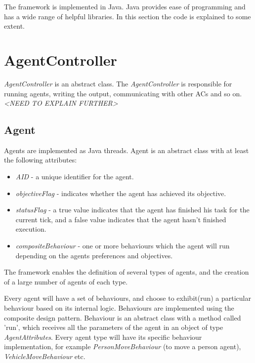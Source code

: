 The framework is implemented in Java. Java provides ease of
programming and has a wide range of helpful libraries. In this section
the code is explained to some extent.

\section{ AgentController }
\textit{AgentController} is an abstract class. The
\textit{AgentController} is responsible for running agents, writing
the output, communicating with other ACs and so on.  \textit{<NEED TO
  EXPLAIN FURTHER>}

\subsection{ Agent }
Agents are implemented as Java threads. Agent is an abstract class
with at least the following attributes:

\begin{itemize}
\item \textit{AID} - a unique identifier for the agent.
\item \textit{objectiveFlag} - indicates whether the agent has
  achieved its objective.
\item \textit{statusFlag} - a true value indicates that the agent has
  finished his task for the current tick, and a false value indicates
  that the agent hasn't finished execution.
\item \textit{compositeBehaviour} - one or more behaviours which the
  agent will run depending on the agents preferences and objectives.
\end{itemize}

The framework enables the definition of several types of agents, and
the creation of a large number of agents of each type.

Every agent will have a set of behaviours, and choose to exhibit(run)
a particular behaviour based on its internal logic. Behaviours are
implemented using the composite design pattern. Behaviour is an
abstract class with a method called 'run', which receives all the
parameters of the agent in an object of type
\textit{AgentAttributes}. Every agent type will have its specific
behaviour implementation, for example \textit{PersonMoveBehaviour} (to
move a person agent), \textit{VehicleMoveBehaviour} etc.

